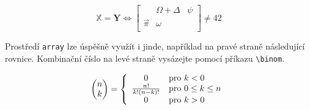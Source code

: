 \documentclass[a4paper, twocolumn, 11pt]{article}
\theoremstyle{definition}
\theoremstyle{definition}
\begin{document}
    $$
        \mathbb{X} = \mathbf{Y} \Longleftrightarrow 
        \left[
            \begin{array}{ccc}
                & \Omega + \Delta & \psi\\
                \overrightarrow{\pi} & \omega & \\  
            \end{array}
        \right] \neq 42
    $$

    Prostředí \verb|array| lze úspěšně využít i jinde, například na pravé straně následující rovnice. 
    Kombinační číslo na levé straně vysázejte pomocí příkazu \verb|\binom|.

    $$
        \begin{pmatrix}
            n\\
            k
        \end{pmatrix}
        = 
        \left\{
            \begin{array}{c l}
                0 & \text{pro } k < 0\\
                \frac{n!}{k!(n-k)!} & \text{pro } 0 \leq k \leq n\\
                0 & \text{pro } k > 0\\
            \end{array}
        \right.
    $$
\end{document}
